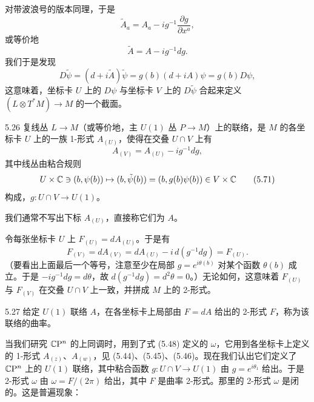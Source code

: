 对带波浪号的版本同理，于是
\begin{equation}
  \tilde A_a=A_a-ig^{-1}\frac{\partial g}{\partial x^a},
  \tag{5.67}
\end{equation}
或等价地
\begin{equation}
  \tilde A=A-ig^{-1}dg.
  \tag{5.68}
\end{equation}
我们于是发现
\begin{equation}
  D\tilde\psi=(d+i\tilde A)\tilde\psi=g(b)(d+iA)\psi=g(b)D\psi,
  \tag{5.69}
\end{equation}
这意味着，坐标卡 $U$ 上的 $D\psi$ 与坐标卡 $V$ 上的 $D\tilde\psi$ 合起来定义 $(L\otimes T^*M)\to M$ 的一个截面。

\begin{definition}{5.26}
  复线丛 $L\to M$（或等价地，主 $U(1)$ 丛 $P\to M$）上的联络，是 $M$ 的各坐标卡 $U$ 上的一族 1-形式 $A_{(U)}$，使得在交叠 $U\cap V$ 上有
  \begin{equation}
    A_{(V)}=A_{(U)}-ig^{-1}dg,
    \tag{5.70}
  \end{equation}
  其中线丛由粘合规则
  \begin{equation}
    U\times\mathbb{C}\ni(b,\psi(b))\mapsto(b,\tilde\psi(b))=(b,g(b)\psi(b))\in V\times\mathbb{C}
    \tag{5.71}
  \end{equation}
  构成，$g:U\cap V\to U(1)$。
\end{definition}

我们通常不写出下标 $A_{(U)}$，直接称它们为 $A$。

令每张坐标卡 $U$ 上 $F_{(U)}=dA_{(U)}$。于是有
\begin{equation}
  F_{(V)}=dA_{(V)}=dA_{(U)}-i\,d(g^{-1}dg)=F_{(U)}.
  \tag{5.72}
\end{equation}
（要看出上面最后一个等号，注意至少在局部 $g=e^{i\theta(b)}$ 对某个函数 $\theta(b)$ 成立。于是 $-ig^{-1}dg=d\theta$，故 $d(g^{-1}dg)=d^2\theta=0$。）无论如何，这意味着 $F_{(U)}$ 与 $F_{(V)}$ 在交叠 $U\cap V$ 上一致，并拼成 $M$ 上的 2-形式。

\begin{notation}{5.27}
  给定 $U(1)$ 联络 $A$，在各坐标卡上局部由 $F=dA$ 给出的 2-形式 $F$，称为该联络的曲率。
\end{notation}

当我们研究 $\mathbb{C}\mathrm{P}^n$ 的上同调时，用到了式 (5.48) 定义的 $\omega$，它用到各坐标卡上定义的 1-形式 $A_{(z)}$、$A_{(w)}$，见 (5.44)、(5.45)、(5.46)。现在我们认出它们定义了 $\mathbb{C}\mathrm{P}^n$ 上的 $U(1)$ 联络，其中粘合函数 $g:U\cap V\to U(1)$ 由 $g=e^{i\theta_1}$ 给出。于是 2-形式 $\omega$ 由 $\omega=F/(2\pi)$ 给出，其中 $F$ 是曲率 2-形式。那里的 2-形式 $\omega$ 是闭的。这是普遍现象：

